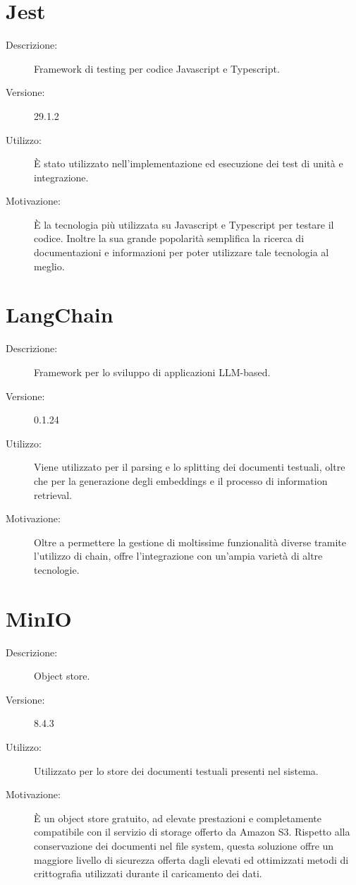 \section{Jest}
\begin{description}
\item[Descrizione:] Framework di testing per codice Javascript e Typescript.
\item[Versione:] 29.1.2
\item[Utilizzo:] È stato utilizzato nell'implementazione ed esecuzione dei test di unità e integrazione.
\item[Motivazione:] È la tecnologia più utilizzata su Javascript e Typescript per testare il codice. Inoltre la sua grande popolarità semplifica la ricerca di documentazioni e informazioni per poter utilizzare tale tecnologia al meglio.
\end{description}

\section{LangChain}
\begin{description}
\item[Descrizione:] Framework per lo sviluppo di applicazioni LLM-based.
\item[Versione:] 0.1.24
\item[Utilizzo:] Viene utilizzato per il parsing e lo splitting dei documenti testuali, oltre che per la generazione degli embeddings e il processo di information retrieval. 
\item[Motivazione:] Oltre a permettere la gestione di moltissime funzionalità diverse tramite l'utilizzo di chain, offre l'integrazione con un'ampia varietà di altre tecnologie. 
\end{description}

\section{MinIO}
\begin{description}
\item[Descrizione:] Object store.
\item[Versione:] 8.4.3
\item[Utilizzo:] Utilizzato per lo store dei documenti testuali presenti nel sistema.
\item[Motivazione:] È un object store gratuito, ad elevate prestazioni e completamente compatibile con il servizio di storage offerto da Amazon S3. Rispetto alla conservazione dei documenti nel file system, questa soluzione offre un maggiore livello di sicurezza offerta dagli elevati ed ottimizzati metodi di crittografia utilizzati durante il caricamento dei dati.
\end{description}

